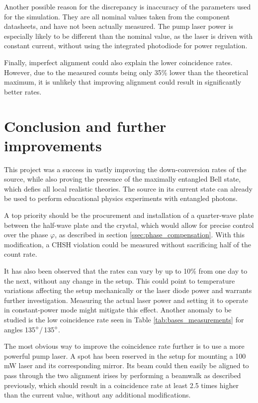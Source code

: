 \documentclass[a4paper,
DIV=13,
12pt,
BCOR=10mm,
department=FakEI,
twoside,
parskip=half,
automark,
logostyle=flat,
]{OTHRartcl}
\begin{document}
Another possible reason for the discrepancy is inaccuracy of the parameters used for the simulation. They are all nominal values taken from the component datasheets, and have not been actually measured. The pump laser power is especially likely to be different than the nominal value, as the laser is driven with constant current, without using the integrated photodiode for power regulation.

Finally, imperfect alignment could also explain the lower coincidence rates. However, due to the measured counts being only 35\% lower than the theoretical maximum, it is unlikely that improving alignment could result in significantly better rates.





\section{Conclusion and further improvements}

This project was a success in vastly improving the down-conversion rates of the source, while also proving the presence of the maximally entangled Bell state, which defies all local realistic theories. The source in its current state can already be used to perform educational physics experiments with entangled photons.

A top priority should be the procurement and installation of a quarter-wave plate between the half-wave plate and the crystal, which would allow for precise control over the phase $\varphi$, as described in section \ref{ssec:phase_compensation}. With this modification, a CHSH violation could be measured without sacrificing half of the count rate.

It has also been observed that the rates can vary by up to 10\% from one day to the next, without any change in the setup. This could point to temperature variations affecting the setup mechanically or the laser diode power and warrants further investigation. Measuring the actual laser power and setting it to operate in constant-power mode might mitigate this effect. Another anomaly to be studied is the low coincidence rate seen in Table \ref{tab:bases_measurements} for angles 135$\degree$/\,135$\degree$.

The most obvious way to improve the coincidence rate further is to use a more powerful pump laser. A spot has been reserved in the setup for mounting a 100 mW laser and its corresponding mirror. Its beam could then easily be aligned to pass through the two alignment irises by performing a beamwalk as described previously, which should result in a coincidence rate at least 2.5 times higher than the current value, without any additional modifications.
\end{document}
